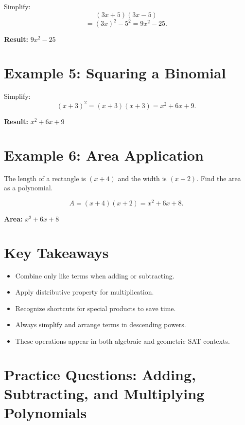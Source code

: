 \documentclass[14pt]{extarticle}
\begin{document}
Simplify:
\[
(3x + 5)(3x - 5)
\]
\[
= (3x)^2 - 5^2 = 9x^2 - 25.
\]

\textbf{Result:} \(\boxed{9x^2 - 25}\)

\section*{Example 5: Squaring a Binomial}

Simplify:
\[
(x + 3)^2 = (x + 3)(x + 3) = x^2 + 6x + 9.
\]

\textbf{Result:} \(\boxed{x^2 + 6x + 9}\)

\section*{Example 6: Area Application}

The length of a rectangle is \((x + 4)\) and the width is \((x + 2)\).  
Find the area as a polynomial.

\[
A = (x + 4)(x + 2) = x^2 + 6x + 8.
\]

\textbf{Area:} \(\boxed{x^2 + 6x + 8}\)

\section*{Key Takeaways}
\begin{itemize}
  \item Combine only like terms when adding or subtracting.
  \item Apply distributive property for multiplication.
  \item Recognize shortcuts for special products to save time.
  \item Always simplify and arrange terms in descending powers.
  \item These operations appear in both algebraic and geometric SAT contexts.
\end{itemize}

\newpage


\section*{Practice Questions: Adding, Subtracting, and Multiplying Polynomials}
\end{document}

